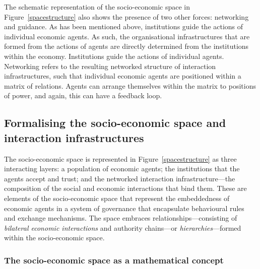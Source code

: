 The schematic representation of the socio-economic space in Figure~\ref{spacestructure} also shows the presence of two other forces: networking and guidance. As has been mentioned above, institutions guide the actions of individual economic agents. As such, the organisational infrastructures that are formed from the actions of agents are directly determined from the institutions within the economy. Institutions guide the actions of individual agents. Networking refers to the resulting networked structure of interaction infrastructures, such that individual economic agents are positioned within a matrix of relations. Agents can arrange themselves within the matrix to positions of power, and again, this can have a feedback loop.

\subsection{Formalising the socio-economic space and interaction infrastructures}

The socio-economic space is represented in Figure~\ref{spacestructure} as three interacting layers: a population of economic agents; the institutions that the agents accept and trust; and the networked interaction infrastructure---the composition of the social and economic interactions that bind them. These are elements of the socio-economic space that represent the embeddedness of economic agents in a system of governance that encapsulate behavioural rules and exchange mechanisms. The space embraces relationships---consisting of \emph{bilateral economic interactions} and authority chains---or \emph{hierarchies}---formed within the socio-economic space.

\subsubsection{The socio-economic space as a mathematical concept}

